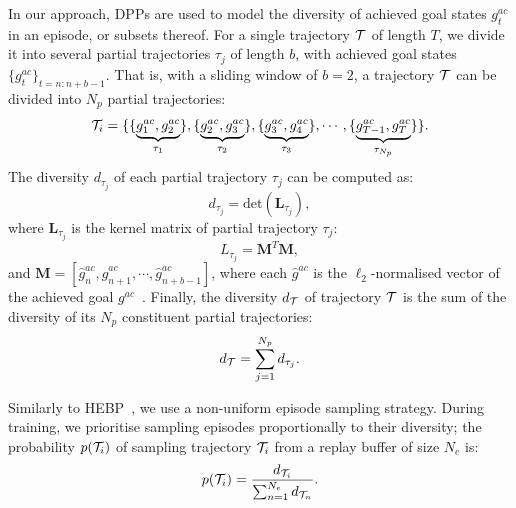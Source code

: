 In our approach, DPPs are used to model the diversity of achieved goal states $g^{ac}_{t}$ in an episode, or subsets thereof. For a single trajectory $\mathcal{T}$ of length $T$, we divide it into several partial trajectories $\tau_{j}$ of length $b$, with achieved goal states $\{g^{ac}_{t}\}_{t=n:n+b-1}$. That is, with a sliding window of $b = 2$, a trajectory $\mathcal{T}$ can be divided into $N_p$ partial trajectories:
\begin{equation}
    \mathcal{T}_{i} = \{\{\underbrace{g^{ac}_{1}, g^{ac}_{2}}_{\tau_{1}}\}, \{\underbrace{g^{ac}_{2}, g^{ac}_{3}}_{\tau_{2}}\}, \{\underbrace{g^{ac}_{3}, g^{ac}_{4}}_{\tau_{3}}\}, \cdots, \{\underbrace{g^{ac}_{T-1}, g^{ac}_{T}}_{\tau_{N_{p}}}\}\}.
\end{equation}
The diversity $d_{\tau_{j}}$ of each partial trajectory $\tau_{j}$ can be computed as:
\begin{equation}
    d_{\tau_{j}} = \text{det}(\mathbf{L}_{\tau_{j}}), 
\label{eq:partial_div}
\end{equation}
where $\mathbf{L}_{\tau_{j}}$ is the kernel matrix of partial trajectory $\tau_{j}$:
\begin{equation}
    L_{\tau_{j}} = \mathbf{M}^{T}\mathbf{M},
\end{equation}
and $\mathbf{M}=[\hat{g}^{ac}_{n}, \hat{g}^{ac}_{n+1}, \cdots, \hat{g}^{ac}_{n+b-1}]$, where each $\hat{g}^{ac}$ is the $\ell_2$-normalised vector of the achieved goal $g^{ac}$~\cite{kulesza2011k}. Finally, the diversity $d_{\mathcal{T}}$ of trajectory $\mathcal{T}$ is the sum of the diversity of its $N_p$ constituent partial trajectories:
\begin{equation}
    d_{\mathcal{T}} = \sum_{j=1}^{N_{p}} d_{\tau_{j}}.
\label{eq:total_div}
\end{equation}

Similarly to HEBP~\cite{zhao2018energy}, we use a non-uniform episode sampling strategy. During training, we prioritise sampling episodes proportionally to their diversity; the probability $p(\mathcal{T}_{i})$ of sampling trajectory $\mathcal{T}_{i}$ from a replay buffer of size $N_{e}$ is:
\begin{equation}
    p(\mathcal{T}_{i}) = \frac{d_{\mathcal{T}_{i}}}{\sum_{n=1}^{N_{e}} d_{\mathcal{T}_{n}}}.
\label{eq:diversity_priority}
\end{equation}

